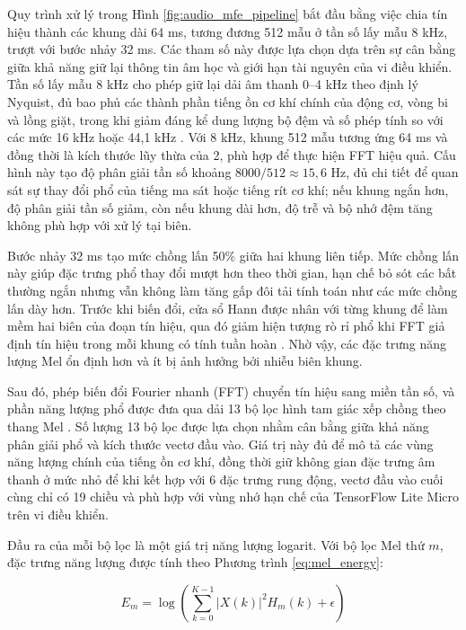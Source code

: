 Quy trình xử lý trong Hình \ref{fig:audio_mfe_pipeline} bắt đầu bằng việc chia tín hiệu thành các khung dài 64 ms, tương đương 512 mẫu ở tần số lấy mẫu 8 kHz, trượt với bước nhảy 32 ms. Các tham số này được lựa chọn dựa trên sự cân bằng giữa khả năng giữ lại thông tin âm học và giới hạn tài nguyên của vi điều khiển. Tần số lấy mẫu 8 kHz cho phép giữ lại dải âm thanh 0--4 kHz theo định lý Nyquist, đủ bao phủ các thành phần tiếng ồn cơ khí chính của động cơ, vòng bi và lồng giặt, trong khi giảm đáng kể dung lượng bộ đệm và số phép tính so với các mức 16 kHz hoặc 44,1 kHz \cite{ref_shul_2023, ref_1_16}. Với 8 kHz, khung 512 mẫu tương ứng 64 ms và đồng thời là kích thước lũy thừa của 2, phù hợp để thực hiện FFT hiệu quả. Cấu hình này tạo độ phân giải tần số khoảng $8000/512 \approx 15{,}6$ Hz, đủ chi tiết để quan sát sự thay đổi phổ của tiếng ma sát hoặc tiếng rít cơ khí; nếu khung ngắn hơn, độ phân giải tần số giảm, còn nếu khung dài hơn, độ trễ và bộ nhớ đệm tăng không phù hợp với xử lý tại biên.

Bước nhảy 32 ms tạo mức chồng lấn 50\% giữa hai khung liên tiếp. Mức chồng lấn này giúp đặc trưng phổ thay đổi mượt hơn theo thời gian, hạn chế bỏ sót các bất thường ngắn nhưng vẫn không làm tăng gấp đôi tải tính toán như các mức chồng lấn dày hơn. Trước khi biến đổi, cửa sổ Hann được nhân với từng khung để làm mềm hai biên của đoạn tín hiệu, qua đó giảm hiện tượng rò rỉ phổ khi FFT giả định tín hiệu trong mỗi khung có tính tuần hoàn \cite{ref_1_16}. Nhờ vậy, các đặc trưng năng lượng Mel ổn định hơn và ít bị ảnh hưởng bởi nhiễu biên khung.

Sau đó, phép biến đổi Fourier nhanh (FFT) chuyển tín hiệu sang miền tần số, và phần năng lượng phổ được đưa qua dải 13 bộ lọc hình tam giác xếp chồng theo thang Mel \cite{ref_1_12}. Số lượng 13 bộ lọc được lựa chọn nhằm cân bằng giữa khả năng phân giải phổ và kích thước vectơ đầu vào. Giá trị này đủ để mô tả các vùng năng lượng chính của tiếng ồn cơ khí, đồng thời giữ không gian đặc trưng âm thanh ở mức nhỏ để khi kết hợp với 6 đặc trưng rung động, vectơ đầu vào cuối cùng chỉ có 19 chiều và phù hợp với vùng nhớ hạn chế của TensorFlow Lite Micro trên vi điều khiển.

Đầu ra của mỗi bộ lọc là một giá trị năng lượng logarit. Với bộ lọc Mel thứ $m$, đặc trưng năng lượng được tính theo Phương trình \ref{eq:mel_energy}:

\begin{equation}
\label{eq:mel_energy}
E_m = \log \left( \sum_{k=0}^{K-1} |X(k)|^2 H_m(k) + \epsilon \right)
\end{equation}

